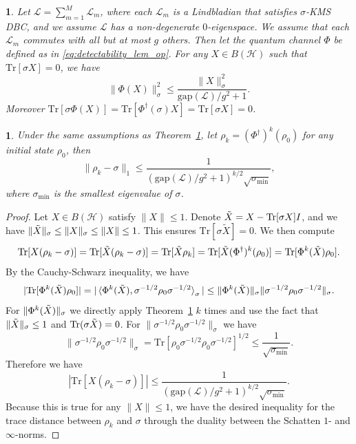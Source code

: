 \documentclass[10pt,a4paper]{amsart}
\newtheorem{thm}{}
\newtheorem{cor}{}
\newcommand{\Tr}{\mathrm{Tr}}
\begin{document}
\begin{thm}
    \label{thm:quantum_gibbs_sampler_shrink}
    Let $\mathcal{L}=\sum_{m=1}^M \mathcal{L}_m$, where each $\mathcal{L}_m$ is a Lindbladian that satisfies $\sigma$-KMS DBC, and we assume $\mathcal{L}$ has a non-degenerate $0$-eigenspace. We assume that each $\mathcal{L}_m$ commutes with all but at most $g$ others. Then let the quantum channel $\Phi$ be defined as in \eqref{eq:detectability_lem_op}. For any $X\in B(\mathcal{H})$ such that $\Tr[\sigma X]=0$, we have
    \[
    \|\Phi(X)\|_\sigma^2\leq \frac{\|X\|_\sigma^2}{\mathrm{gap}(\mathcal{L})/g^2+1}.
    \]
    Moreover $\Tr[\sigma \Phi(X)]=\Tr[\Phi^\dag(\sigma) X]=\Tr[\sigma X]=0$.
\end{thm}

\begin{cor}
    \label{cor:prepare_gibbs_state_quantum_gibbs_sampler}
    Under the same assumptions as Theorem~\ref{thm:quantum_gibbs_sampler_shrink}, let $\rho_k=(\Phi^\dag)^k(\rho_0)$ for any initial state $\rho_0$, then
    \[
    \|\rho_k-\sigma\|_1\leq \frac{1}{(\mathrm{gap}(\mathcal{L})/g^2+1)^{k/2}\sqrt{\sigma_{\min}}},
    \]
    where $\sigma_{\min}$ is the smallest eigenvalue of $\sigma$.
\end{cor}

\begin{proof}
    Let $X\in B(\mathcal{H})$ satisfy $\|X\|\leq 1$. Denote $\Tilde{X} = X - \Tr[\sigma X] I$, and we have $\|\Tilde{X}\|_\sigma\leq \|X\|_\sigma\leq \|X\|\leq 1$. This ensures $\Tr[\sigma\tilde{X}]=0$. We then compute
    \[
    \Tr[X(\rho_k-\sigma)] = \Tr[\Tilde{X}(\rho_k-\sigma)]=\Tr[\Tilde{X}\rho_k]=\Tr[\Tilde{X}(\Phi^\dag)^k(\rho_0)] = \Tr[\Phi^k(\Tilde{X})\rho_0].
    \]
    By the Cauchy-Schwarz inequality, we have
    \[
    |\Tr[\Phi^k(\Tilde{X})\rho_0]|=|\braket{\Phi^k(\Tilde{X}),\sigma^{-1/2}\rho_0\sigma^{-1/2}}_\sigma|\leq \|\Phi^k(\Tilde{X})\|_\sigma\|\sigma^{-1/2}\rho_0\sigma^{-1/2}\|_\sigma.
    \]
    For $\|\Phi^k(\Tilde{X})\|_\sigma$ we directly apply Theorem~\ref{thm:quantum_gibbs_sampler_shrink} $k$ times and use the fact that $\|\Tilde{X}\|_\sigma\leq 1$ and $\Tr(\sigma \Tilde{X}) = 0$. For $\|\sigma^{-1/2}\rho_0\sigma^{-1/2}\|_\sigma$ we have
    \[
    \|\sigma^{-1/2}\rho_0\sigma^{-1/2}\|_\sigma = \Tr[\rho_0\sigma^{-1/2}\rho_0\sigma^{-1/2}]^{1/2}\leq \frac{1}{\sqrt{\sigma_{\min}}}.
    \]
    Therefore we have
    \[
    |\Tr[X(\rho_k-\sigma)]|\leq \frac{1}{(\mathrm{gap}(\mathcal{L})/g^2+1)^{k/2}\sqrt{\sigma_{\min}}}.
    \]
    Because this is true for any $\|X\|\leq 1$, we have the desired inequality for the trace distance between $\rho_k$ and $\sigma$ through the duality between the Schatten $1$- and $\infty$-norms.
\end{proof}
\end{document}
